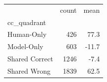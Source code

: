 \begin{tabular}{lrr}
\toprule
 & count & mean \\
cc_quadrant &  &  \\
\midrule
Human-Only & 426 & 77.3 \\
Model-Only & 603 & -11.7 \\
Shared Correct & 1246 & -7.4 \\
Shared Wrong & 1839 & 62.5 \\
\bottomrule
\end{tabular}
